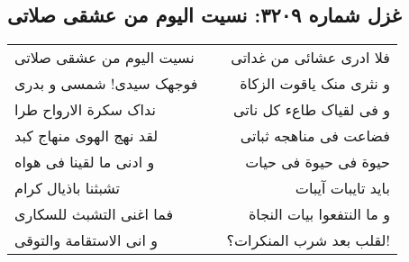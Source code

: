 \begin{center}
\section*{غزل شماره ۳۲۰۹: نسیت الیوم من عشقی صلاتی}
\label{sec:3209}
\begin{longtable}{l p{0.5cm} r}
نسیت الیوم من عشقی صلاتی
&&
فلا ادری عشائی من غداتی
\\
فوجهک سیدی! شمسی و بدری
&&
و نثری منک یاقوت الزکاة
\\
نداک سکرة الارواح طرا
&&
و فی لقیاک طاعء کل ناتی
\\
لقد نهج الهوی منهاج کبد
&&
فضاعت فی مناهجه ثباتی
\\
و ادنی ما لقینا فی هواه
&&
حیوة فی حیوة فی حیات
\\
تشبثنا باذیال کرام
&&
باید تایبات آیبات
\\
فما اغنی التشبث للسکاری
&&
و ما النتفعوا بیات النجاة
\\
و انی الاستقامة والتوقی
&&
لقلب بعد شرب المنکرات؟!
\\
\end{longtable}
\end{center}
